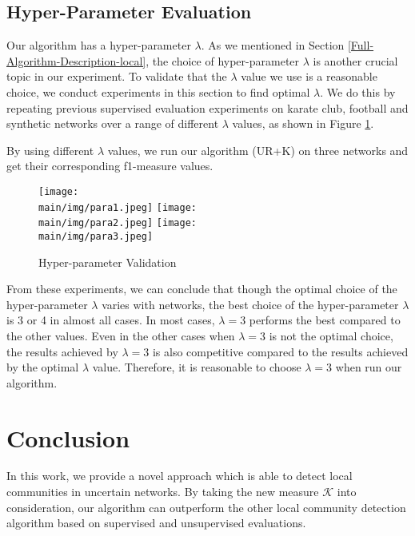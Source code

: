 \documentclass[\main/thesis.tex]{subfiles}
\begin{document}
\subsection{Hyper-Parameter Evaluation} \label{Hyper-Parameter-Evaluation-Local}
Our algorithm has a hyper-parameter $\lambda$. As we mentioned in Section \ref{Full-Algorithm-Description-local}, the choice of hyper-parameter $\lambda$ is another crucial topic in our experiment. To validate that the $\lambda$ value we use is a reasonable choice, we conduct experiments in this section to find optimal $\lambda$. We do this by repeating previous supervised evaluation experiments on karate club, football and synthetic networks over a range of different $\lambda$ values, as shown in Figure \ref{Hyper-Parameter-Evaluation-local-graph}. 

By using different $\lambda$ values, we run our algorithm (UR+K) on three networks and get their corresponding f1-measure values. 

\begin{figure}
\texttt{[image: \\main/img/para1.jpeg]}
\texttt{[image: \\main/img/para2.jpeg]}
\centering
\texttt{[image: \\main/img/para3.jpeg]}
\caption{Hyper-parameter Validation}
\label{Hyper-Parameter-Evaluation-local-graph}
\end{figure}

From these experiments, we can conclude that though the optimal choice of the hyper-parameter $\lambda$ varies with networks, the best choice of the hyper-parameter $\lambda$ is 3 or 4 in almost all cases. In most cases, $\lambda=3$ performs the best compared to the other values. Even in the other cases when $\lambda=3$ is not the optimal choice, the results achieved by $\lambda=3$ is also competitive compared to the results achieved by the optimal $\lambda$ value. Therefore, it is reasonable to choose $\lambda=3$ when run our algorithm.

\section{Conclusion}
In this work, we provide a novel approach which is able to detect local communities in uncertain networks. By taking the new measure $\mathcal{K}$ into consideration, our algorithm can outperform the other local community detection algorithm based on supervised and unsupervised evaluations.
\end{document}
